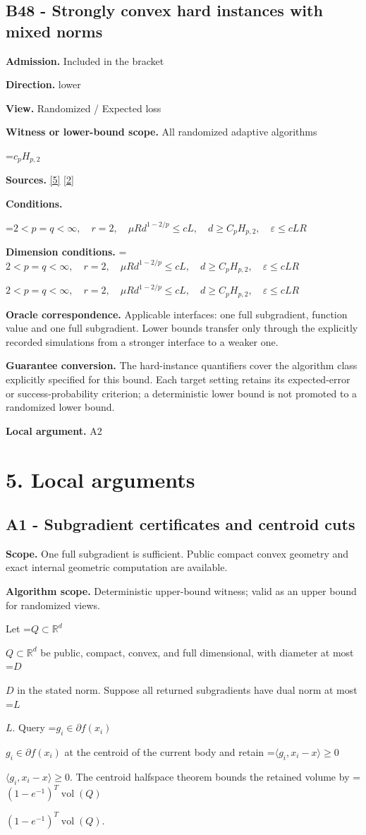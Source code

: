 \documentclass[10pt,a4paper]{article}
\newcommand{\AtlasMath}[1]{\par\begingroup\centering\setbox0=\hbox{$\displaystyle #1$}\ifdim\wd0>1.4\linewidth\typeout{ATLAS WIDE FORMULA: \the\wd0}\fi\ifdim\wd0>\linewidth\resizebox{\linewidth}{!}{\box0}\else\box0\fi\par\endgroup}
\newcommand{\AtlasInlineMath}[1]{\begingroup\setbox0=\hbox{$#1$}\ifdim\wd0>.4\linewidth\endgroup\AtlasMath{#1}\else\endgroup$#1$\fi}
\begin{document}
\subsection{B48 - Strongly convex hard instances with mixed norms}
\textbf{Admission.} Included in the bracket

\textbf{Direction.} lower

\textbf{View.} Randomized / Expected loss

\textbf{Witness or lower-bound scope.} All randomized adaptive algorithms

\AtlasMath{c_pH_{p,2}}
\textbf{Sources.} \href{https://arxiv.org/pdf/1407.5144}{[5]} \href{https://arxiv.org/pdf/1401.1792}{[2]}

\textbf{Conditions.} 
\AtlasMath{2<p=q<\infty,\quad r=2,\quad\mu R d^{1-2/p}\le cL,\quad d\ge C_pH_{p,2},\quad\varepsilon\le cLR}


\textbf{Dimension conditions.} \AtlasInlineMath{2<p=q<\infty,\quad r=2,\quad\mu R d^{1-2/p}\le cL,\quad d\ge C_pH_{p,2},\quad\varepsilon\le cLR}

\textbf{Oracle correspondence.} Applicable interfaces: one full subgradient, function value and one full subgradient. Lower bounds transfer only through the explicitly recorded simulations from a stronger interface to a weaker one.

\textbf{Guarantee conversion.} The hard-instance quantifiers cover the algorithm class explicitly specified for this bound. Each target setting retains its expected-error or success-probability criterion; a deterministic lower bound is not promoted to a randomized lower bound.

\textbf{Local argument.} A2

\section{5. Local arguments}
\subsection{A1 - Subgradient certificates and centroid cuts}
\textbf{Scope.} One full subgradient is sufficient. Public compact convex geometry and exact internal geometric computation are available.

\textbf{Algorithm scope.} Deterministic upper-bound witness; valid as an upper bound for randomized views.

Let \AtlasInlineMath{Q\subset\mathbb R^d} be public, compact, convex, and full dimensional, with diameter at most \AtlasInlineMath{D} in the stated norm. Suppose all returned subgradients have dual norm at most \AtlasInlineMath{L}. Query \AtlasInlineMath{g_i\in\partial f(x_i)} at the centroid of the current body and retain \AtlasInlineMath{\langle g_i,x_i-x\rangle\ge0}. The centroid halfspace theorem bounds the retained volume by \AtlasInlineMath{(1-e^{-1})^T\operatorname{vol}(Q)}.
\end{document}
